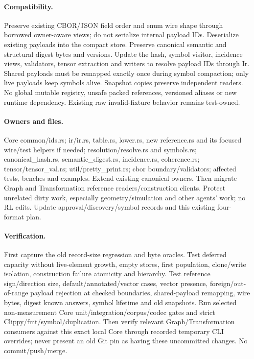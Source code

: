 \documentclass[11pt,a4paper]{article}
\begin{document}
\paragraph{Compatibility.} Preserve existing CBOR/JSON field order and enum wire
shape through borrowed owner-aware views; do not serialize internal payload IDs.
Deserialize existing payloads into the compact store. Preserve canonical semantic
and structural digest bytes and versions. Update the hash, symbol visitor,
incidence views, validators, tensor extraction and writers to resolve payload IDs
through Ir. Shared payloads must be remapped exactly once during symbol compaction;
only live payloads keep symbols alive. Snapshot copies preserve independent readers.
No global mutable registry, unsafe packed references, versioned aliases or new
runtime dependency. Existing raw invalid-fixture behavior remains test-owned.
\paragraph{Owners and files.} Core common/ids.rs; ir/ir.rs, table.rs, lower.rs,
new reference.rs and its focused wire/test helpers if needed; resolution/resolve.rs
and symbols.rs; canonical\_hash.rs, semantic\_digest.rs, incidence.rs, coherence.rs;
tensor/tensor\_val.rs; util/pretty\_print.rs; cbor boundary/validators; affected tests,
benches and examples. Extend existing canonical owners. Then migrate Graph and
Transformation reference readers/construction clients. Protect unrelated dirty
work, especially geometry/simulation and other agents' work; no RL edits.
Update approval/discovery/symbol records and this existing four-format plan.
\paragraph{Verification.} First capture the old record-size regression and byte
oracles. Test deferred capacity without live-element growth, empty stores, first
population, clone/write isolation, construction failure atomicity and hierarchy.
Test reference sign/direction size, default/annotated/vector cases, vector presence,
foreign/out-of-range payload rejection at checked boundaries, shared-payload
remapping, wire bytes, digest known answers, symbol lifetime and old snapshots.
Run selected non-measurement Core unit/integration/corpus/codec gates and strict
Clippy/fmt/symbol/duplication. Then verify relevant Graph/Transformation consumers
against this exact local Core through recorded temporary CLI overrides; never
present an old Git pin as having these uncommitted changes. No commit/push/merge.
\end{document}
